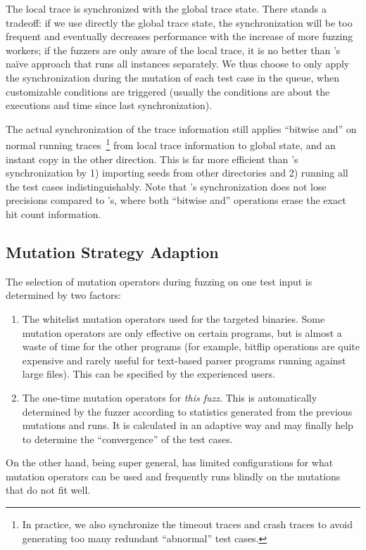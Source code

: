 The local trace is synchronized with the global trace state. There stands a tradeoff: if we use directly the global trace state, the synchronization will be too frequent and eventually decreases performance with the increase of more fuzzing workers; if the fuzzers are only aware of the local trace, it is no better than {\AFL}'s na\"ive approach that runs all instances separately. We thus choose to only apply the synchronization during the mutation of each test case in the queue, when customizable conditions are triggered (usually the conditions are about the executions and time since last synchronization).

The actual synchronization of the trace information still applies ``bitwise and'' on normal running traces~\footnote{In practice, we also synchronize the timeout traces and crash traces to avoid generating too many redundant ``abnormal'' test cases.} from local trace information to global state, and an instant copy in the other direction. This is far more efficient than {\AFL}'s synchronization by 1) importing seeds from other directories and 2) running all the test cases indistinguishably. Note that {\FOT}'s synchronization does not lose precisions compared to {\AFL}'s, where both ``bitwise and'' operations erase the exact hit count information.


  \subsection{Mutation Strategy Adaption}\label{sec:mutation_ops}
 The selection of mutation operators during fuzzing on one test input is determined by two factors:
 \begin{enumerate}
 	\item The whitelist mutation operators used for the targeted binaries. Some mutation operators are only effective on certain programs, but is almost a waste of time for the other programs (for example, bitflip operations are quite expensive and rarely useful for text-based parser programs running against large files). This can be specified by the experienced {\FOT} users.
 	\item The one-time mutation operators for \emph{this fuzz}. This is automatically determined by the fuzzer according to statistics generated from the previous mutations and runs. It is calculated in an adaptive way and may finally help to determine the ``convergence'' of the test cases.
 \end{enumerate}

On the other hand, being super general, {\AFL} has limited configurations for what mutation operators can be used and frequently runs blindly on the mutations that do not fit well.


